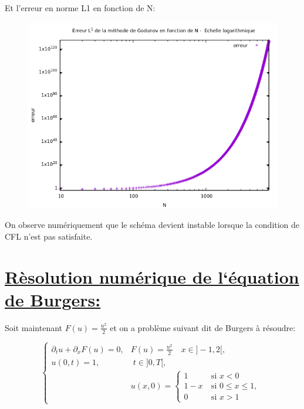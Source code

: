 Et l'erreur en norme L1 en fonction de N:

\begin{figure}[h!]
	\centering \includegraphics[scale=0.7]{Images_Fichiers/erreur2.png}
\end{figure}

On observe num\'eriquement que le sch\'ema devient instable lorsque la condition de CFL n’est pas satisfaite.

\section[R\`esolution num\'erique de l`\'equation de Burgers]{\uline{R\`esolution num\'erique de l`\'equation de Burgers:}}

Soit maintenant $F(u)=\frac{u^2}{2}$ et on a probl\`eme suivant dit de Burgers \`a r\'esoudre:

\begin{equation}
\label{systeme}
\left \lbrace \begin{array}{rl}
\partial_t u +  \partial_x F(u)= 0, & F(u) = \frac{u^2}{2} \quad x \in ]-1,2[,  \\
u(0,t) = 1, & \; t \in ]0,T[, \\
& u(x,0) =
\left \lbrace \begin{array}{rl}
1 & ~\text{si }  x < 0\\
1-x & ~\text{si }  0 \leq x \leq 1, \\
0 & ~\text{si }  x > 1
\end{array}\right.
\end{array}\right.
\end{equation}

